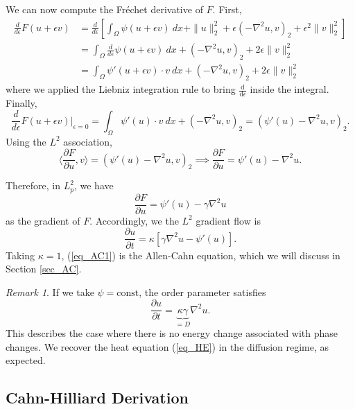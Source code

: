 \documentclass[12pt, reqno]{report}
\theoremstyle{definition}
\theoremstyle{remark}
\newtheorem{remark}[theorem]{Remark}
\newcommand{\ud}{\mathrm{d}}
\begin{document}
We can now compute the Fr\'echet derivative of $F$. First,
\begin{align}
    \frac{d}{d \epsilon}F(u+\epsilon v)&= \frac{d}{d \epsilon}\left[\int_{\Omega}\psi(u+\epsilon v)\ dx+\|u\|_{2}^{2}+\epsilon(-\nabla ^{2}u,v)_{2}+\epsilon^{2}\|v\|_{2}^{2}\right]\\
    &= \int_{\Omega} \frac{d}{d \epsilon}\psi(u+\epsilon v)~dx+(-\nabla ^{2}u,v)_{2}+2\epsilon \|v\|_{2}^{2}\\
    &= \int_{\Omega}\psi'(u+\epsilon v)\cdot v~dx+(-\nabla ^{2}u,v)_{2}+2\epsilon \|v\|^{2}_{2}
\end{align}
where we applied the Liebniz integration rule to bring $\frac{\ud}{\ud\epsilon}$ inside the integral. 
Finally,
\begin{equation}
    \frac{d}{d \epsilon}F(u+\epsilon v)\bigg|_{\epsilon=0}=\int_{\Omega} \psi'(u)\cdot v~dx+(-\nabla ^{2}u,v)_{2}=(\psi'(u)-\nabla ^{2}u,v)_{2}.
\end{equation}
Using the $L^{2}$ association,
\begin{equation} 
    \langle \frac{\partial F}{\partial u},v\rangle=(\psi'(u)-\nabla ^{2}u,v)_{2}\implies \frac{\partial F}{\partial u}=\psi'(u)-\nabla ^{2}u.
\end{equation}
    
Therefore, in $L^{2}_{p}$, we have
\begin{equation} 
    \frac{\partial F}{\partial u}=\psi'(u)-\gamma\nabla ^{2}u
\end{equation}
as the gradient of $F$.
Accordingly, we the $L^{2}$ gradient flow is
\begin{equation} \label{eq_AC1}
    \frac{\partial u}{\partial t}=\kappa[\gamma \nabla ^{2}u-\psi'(u)].
\end{equation}
Taking $\kappa=1$, (\ref{eq_AC1}) is the Allen-Cahn equation, which we will discuss in Section \ref{sec_AC}.

\begin{remark}
If we take $\psi =\text{const}$, the order parameter satisfies
\begin{equation}
    \frac{\partial u}{\partial t}=\underbrace{\kappa\gamma}_{=D}\nabla^2u.
\end{equation}
This describes the case where there is no energy change associated with phase changes.
We recover the heat equation (\ref{eq_HE}) in the diffusion regime, as expected.
\end{remark}


\subsection{Cahn-Hilliard Derivation}
\end{document}
